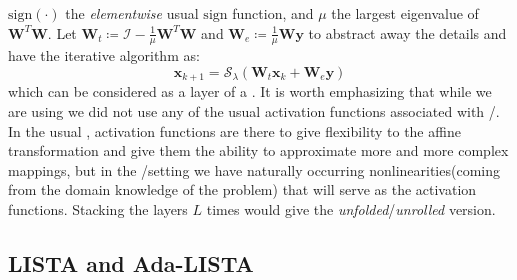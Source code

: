 $\mathrm{sign}(\boldsymbol{\cdot})$ the \emph{elementwise} usual $\mathrm{sign}$ function, and $\mu$ the largest eigenvalue of $\boldsymbol{W}^T\boldsymbol{W}$. Let $\boldsymbol{W}_t \coloneqq \mathcal{I}-\frac{1}{\mu}\boldsymbol{W}^T\boldsymbol{W}$ and 
$\boldsymbol{W}_e \coloneqq \frac{1}{\mu}\boldsymbol{W}\boldsymbol{y}$ to abstract away the details  and have the iterative algorithm 
as:
\begin{equation*}
  \boldsymbol{x}_{k+1} = \mathcal{S}_\lambda\left(\boldsymbol{W}_t\boldsymbol{x}_{k}+\boldsymbol{W}_e\boldsymbol{y}\right)
\end{equation*}
which can be considered as a layer of a \nn{}. It is worth emphasizing that 
while we are using \nns we did not use any of the usual activation functions associated with \ml/\dl.
In the usual \nns, activation functions are there to give flexibility to the affine transformation 
and give them the ability to approximate more and more complex mappings, but in the \du/\au setting we have naturally occurring 
nonlinearities(coming from the domain knowledge of the problem) that will serve as the activation 
functions. Stacking the layers $L$ times would give the \emph{unfolded}/\emph{unrolled} version.

\subsection{LISTA and Ada-LISTA}

